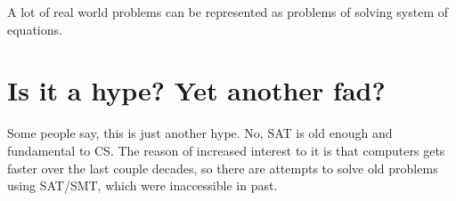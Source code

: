 A lot of real world problems can be represented as problems of solving system of equations.

\section{Is it a hype? Yet another fad?}

Some people say, this is just another hype.
No, \ac{SAT} is old enough and fundamental to \ac{CS}.
The reason of increased interest to it is that computers gets faster over the last couple decades,
so there are attempts to solve old problems using \ac{SAT}/\ac{SMT}, which were inaccessible in past.

